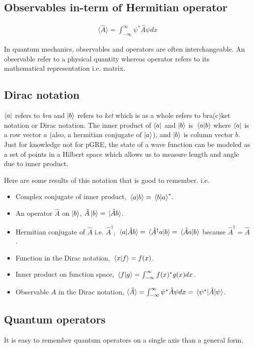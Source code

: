 \subsection{Observables in-term of Hermitian operator}
\begin{align*}
\langle\hat{A}\rangle = \int_{-\infty}^{\infty} \psi^{*} \hat{A} \psi dx
\end{align*}

In quantum mechanics, observables and operators are often interchangeable. An observable refer to a physical quantity whereas operator refers to its mathematical representation i.e. matrix.

\subsection{Dirac notation}
$\bra{a}$ refers to \emph{bra} and $\ket{b}$ refers to \emph{ket} which is as a whole refers to bra(c)ket notation or Dirac notation. The inner product of $\bra{a}$ and $\ket{b}$ is $\braket*{a}{b}$ where $\bra{a}$ is a row vector $a$ (also, a hermitian conjugate of $\ket{a}$), and $\ket{b}$ is column vector $b$. Just for knowledge not for pGRE, the state of a wave function can be modeled as a set of points in a Hilbert space which allows us to measure length and angle due to inner product. 

Here are some results of this notation that is good to remember. i.e.
\begin{itemize}
\item Complex conjugate of inner product, $\braket*{a}{b} = \braket*{b}{a}^{*}$. 
\item An operator $\hat{A}$ on $\ket{b}$, $\hat{A}\ket{b} = \ket*{\hat{A}b}$.
\item Hermitian conjugate of $\hat{A}$ i.e. $\hat{A}^{\dagger}$, $ \braket*{a}{\hat{A}b} =  \braket*{\hat{A}^{\dagger} a}{b} = \braket*{\hat{A} a}{b}$ because $\hat{A}^{\dagger} = \hat{A}$.
\item Function in the Dirac notation, $\braket*{x}{f} = f(x)$.
\item Inner product on function space, $\braket*{f}{g} = \int_{-\infty}^{\infty} f(x)^{*} g(x) dx$.
\item Observable $A$ in the Dirac notation, $\langle\hat{A}\rangle = \int_{-\infty}^{\infty} \psi^{*} \hat{A} \psi dx = \mel{\psi^{*}}{\hat{A}}{\psi}$.
\end{itemize}

\subsection{Quantum operators}
It is easy to remember quantum operators on a single axis than a general form.

